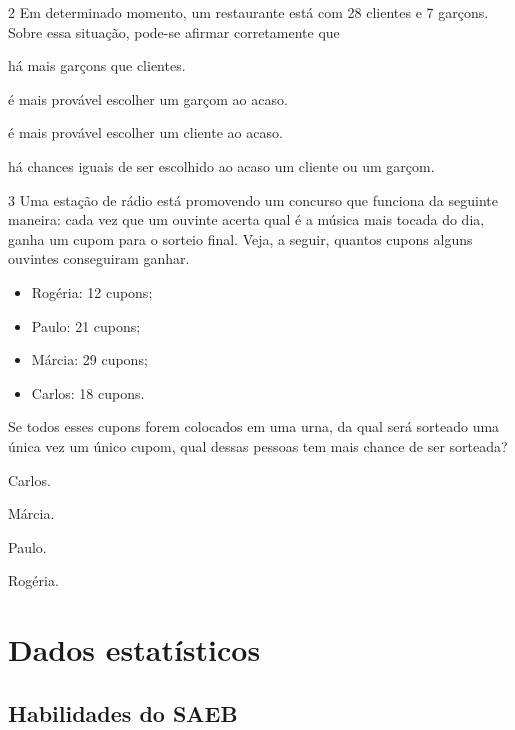 \num{2} Em determinado momento, um restaurante está com 28 clientes e 7
garçons. Sobre essa situação, pode-se afirmar corretamente que

\begin{escolha}
\item
  há mais garçons que clientes.
\item
  é mais provável escolher um garçom ao acaso.
\item
  é mais provável escolher um cliente ao acaso.
\item
  há chances iguais de ser escolhido ao acaso um cliente ou um garçom.
\end{escolha}


\num{3} Uma estação de rádio está promovendo um concurso que funciona da seguinte maneira: cada vez que um ouvinte acerta qual é a música mais tocada do dia, ganha um cupom para o sorteio final. Veja, a seguir, quantos cupons alguns ouvintes conseguiram ganhar.

\begin{mdframed}[linewidth=2pt,linecolor=azul!20,backgroundcolor=azul!20,roundcorner=2pt]
\begin{itemize}
  \item Rogéria: 12 cupons;
  \item Paulo: 21 cupons;
  \item Márcia: 29 cupons;
  \item Carlos: 18 cupons.
\end{itemize}
\end{mdframed}

Se todos esses cupons forem colocados em uma urna, da qual será sorteado uma única vez um único cupom, qual dessas pessoas tem mais chance de ser sorteada?

\begin{escolha}
\item
  Carlos.
\item
  Márcia.
\item
  Paulo.
\item
  Rogéria.
\end{escolha}


\chapter{Dados estatísticos}

\section{Habilidades do SAEB}


